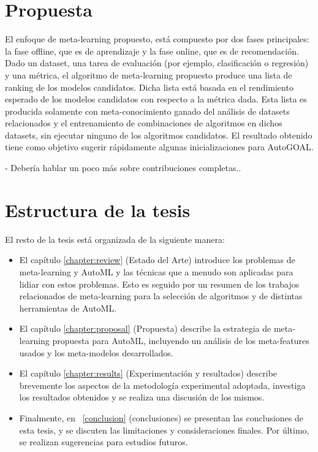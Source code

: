 \section*{Propuesta}

El enfoque de meta-learning propuesto, está compuesto por dos fases principales: la fase offline, que es de aprendizaje y la fase online, que es de recomendación. Dado un dataset, una tarea de evaluación (por ejemplo, clasificación o regresión) y una métrica, el algoritmo de meta-learning propuesto produce una lista de ranking de los modelos candidatos. Dicha lista está basada en el rendimiento esperado de los modelos candidatos con respecto a la métrica dada. Esta lista es producida solamente con meta-conocimiento ganado del análisis de datasets relacionados y el entrenamiento de combinaciones de algoritmos en dichos datasets, sin ejecutar ninguno de los algoritmos candidatos. El resultado obtenido tiene como objetivo sugerir rápidamente algunas inicializaciones para AutoGOAL.

- Debería hablar un poco más sobre contribuciones completas..

\section*{Estructura de la tesis}

El resto de la tesis está organizada de la siguiente manera:

\begin{itemize}
	\item El capítulo \ref{chapter:review} (Estado del Arte) introduce los problemas de meta-learning y AutoML y las técnicas que a menudo son aplicadas para lidiar con estos problemas. Esto es seguido por un resumen de los trabajos relacionados de meta-learning para la selección de algoritmos y de distintas herramientas de AutoML.
	\item El capítulo \ref{chapter:proposal} (Propuesta) describe la estrategia de meta-learning propuesta para AutoML, incluyendo un análisis de los meta-features usados y los meta-modelos desarrollados.
	\item El capítulo \ref{chapter:results} (Experimentación y resultados) describe brevemente los aspectos de la metodología experimental adoptada, investiga los resultados obtenidos y se realiza una discusión de los mismos.
	\item Finalmente, en ~\ref{conclusion} (conclusiones) se presentan las conclusiones de esta tesis, y se discuten las limitaciones y consideraciones finales. Por último, se realizan sugerencias para estudios futuros.
\end{itemize}